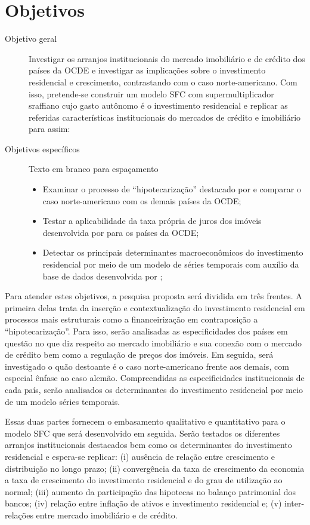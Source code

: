 \section{Objetivos}\label{OBJ}

\begin{description}
	\item[Objetivo geral] Investigar os arranjos institucionais do mercado imobiliário e de crédito dos países da OCDE e investigar as implicações sobre o investimento residencial e crescimento, contrastando com o caso norte-americano. Com isso, pretende-se construir um modelo SFC com supermultiplicador sraffiano cujo gasto autônomo é o investimento residencial e replicar as referidas características institucionais do mercados de crédito e imobiliário para assim:
	\item[Objetivos específicos] {\color{white} Texto em branco para espaçamento}
	\begin{itemize}
		\item Examinar o processo de ``hipotecarização'' destacado por \textcite{jorda_great_2014} e comparar o caso norte-americano com os demais países da OCDE;
		\item Testar a aplicabilidade da taxa própria de juros dos imóveis desenvolvida por \textcite{teixeira_crescimento_2015} para os países da OCDE; 
		\item Detectar os principais determinantes macroeconômicos do investimento residencial por meio de um modelo de séries temporais com auxílio da base de dados desenvolvida por \textcite{jorda_great_2014};
	\end{itemize}
\end{description}


Para atender estes objetivos, a pesquisa proposta será dividida em três frentes.
A primeira delas trata da inserção e contextualização do investimento residencial em processos mais estruturais como a financeirização em contraposição a ``hipotecarização''. Para isso, serão analisadas as especificidades dos países em questão no que diz respeito ao mercado imobiliário e sua conexão com o mercado de crédito bem como a regulação de preços dos imóveis. Em seguida, será investigado o quão destoante é o caso norte-americano frente aos demais, com especial ênfase ao caso alemão. Compreendidas as especificidades institucionais de cada país, serão analisados os determinantes do investimento residencial por meio de um modelo séries temporais. 

Essas duas partes fornecem o embasamento qualitativo e quantitativo para o modelo SFC que será desenvolvido em seguida. Serão testados os diferentes arranjos institucionais destacados bem como os determinantes do investimento residencial e espera-se replicar: 
	(i) ausência de relação entre crescimento e distribuição no longo prazo; 
	(ii) convergência da taxa de crescimento da economia a taxa de crescimento do investimento residencial e do grau de utilização ao normal; 
	(iii) aumento da participação das hipotecas no balanço patrimonial dos bancos;
	(iv) relação entre inflação de ativos e investimento residencial e; 
	(v) inter-relações entre mercado imobiliário e de crédito. 


